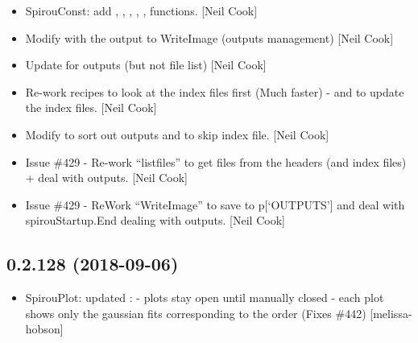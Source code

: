 \documentclass[a4paper,10pt,english]{report}
\begin{document}
\begin{itemize}
\item {} 
SpirouConst: add , ,
, , ,
 functions. {[}Neil Cook{]}

\item {} 
Modify  with the output to WriteImage (outputs management)
{[}Neil Cook{]}

\item {} 
Update  for outputs (but not file list) {[}Neil Cook{]}

\item {} 
Re-work  recipes to look at the index files first (Much
faster) - and to update the index files. {[}Neil Cook{]}

\item {} 
Modify  to sort out outputs and to skip index
file. {[}Neil Cook{]}

\item {} 
Issue \#429 - Re-work “listfiles” to get files from the headers (and
index files) + deal with outputs. {[}Neil Cook{]}

\item {} 
Issue \#429 - ReWork “WriteImage” to save to p{[}‘OUTPUTS’{]} and deal with
spirouStartup.End dealing with outputs. {[}Neil Cook{]}

\end{itemize}


\subsection{0.2.128 (2018-09-06)}
\label{\detokenize{misc/changelog:id335}}\begin{itemize}
\item {} 
SpirouPlot: updated : - plots stay open
until manually closed - each plot shows only the gaussian fits
corresponding to the order (Fixes \#442) {[}melissa-hobson{]}

\end{itemize}
\end{document}

